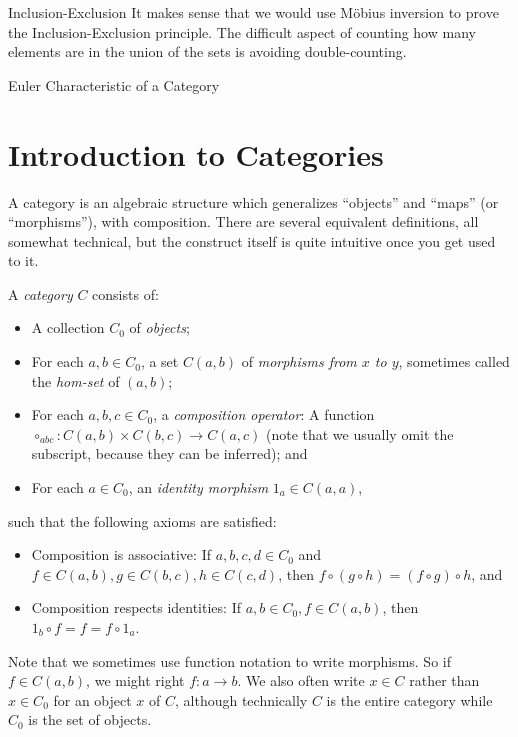 \documentclass[12pt]{pom_thesis}
\begin{document}
\begin{chapter}{Inclusion-Exclusion}
It makes sense that we would use M\"obius inversion to prove the Inclusion-Exclusion principle. The difficult aspect of counting how many elements are in the union of the sets is avoiding double-counting. %

\end{chapter}

\begin{chapter}{Euler Characteristic of a Category}\label{chap_euler}
\section{Introduction to Categories} \label{cat_defs}

A category is an algebraic structure which generalizes ``objects'' and ``maps'' (or ``morphisms''), with composition. There are several equivalent definitions, all somewhat technical, but the construct itself is quite intuitive once you get used to it.  
\begin{defn}
A \textit{category} $C$ consists of:
\begin{itemize}
\item A collection $C_0$ of \emph{objects};
\item For each $a,b \in C_0$, a set $C(a,b)$ of \emph{morphisms from $x$ to $y$}, sometimes called the \emph{hom-set} of $(a,b)$;
\item For each $a,b,c \in C_0$, a \emph{composition operator}: A function $\circ_{abc} :C(a,b) \times C(b,c) \rightarrow C(a,c)$ (note that we usually omit the subscript, because they can be inferred); and
\item For each $a \in C_0$, an \emph{identity morphism} $1_a \in C(a,a)$,
\end{itemize}
such that the following axioms are satisfied:
\begin{itemize}
\item Composition is associative: If $a,b,c,d \in C_0$ and $f\in C(a,b), g \in C(b,c), h \in C(c,d)$, then $f \circ (g \circ h) = (f \circ g) \circ h$, and
\item Composition respects identities: If $a,b \in C_0, f \in C(a,b)$, then $1_b \circ f = f = f \circ 1_a$.
\end{itemize}
\end{defn}
Note that we sometimes use function notation to write morphisms. So if $f \in C(a,b)$, we might right $f:a \rightarrow b$. We also often write $x \in C$ rather than $x \in C_0$ for an object $x$ of $C$, although technically $C$ is the entire category while $C_0$ is the set of objects.


\end{chapter}
\end{document}

